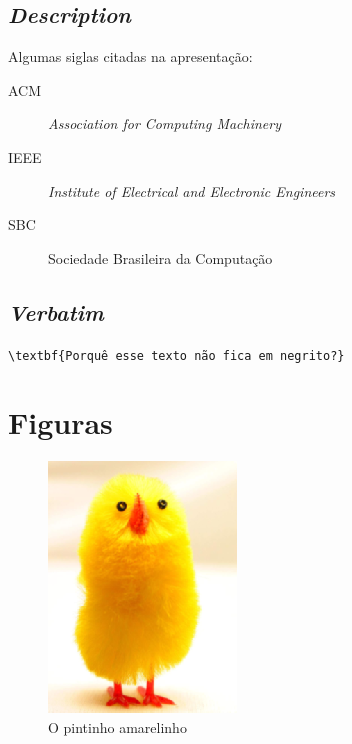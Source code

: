 \documentclass{article}
\begin{document}
		\subsection{\textit{Description}}
			Algumas siglas citadas na apresentação:
			\begin{description}
				\item[ACM] \textit{Association for Computing Machinery}
				\item[IEEE]	\textit{Institute of Electrical and Electronic Engineers}
				\item[SBC] Sociedade Brasileira da Computação
			\end{description}

		\subsection{\textit{Verbatim}}
			\label{verbatim}\verb|\textbf{Porquê esse texto não fica em negrito?}|
	
	\section{Figuras}
		\begin{figure}[h]
			\centering
			\label{pinto}
			\includegraphics{chick.png}
			\caption{O pintinho amarelinho}
		\end{figure}
\end{document}
